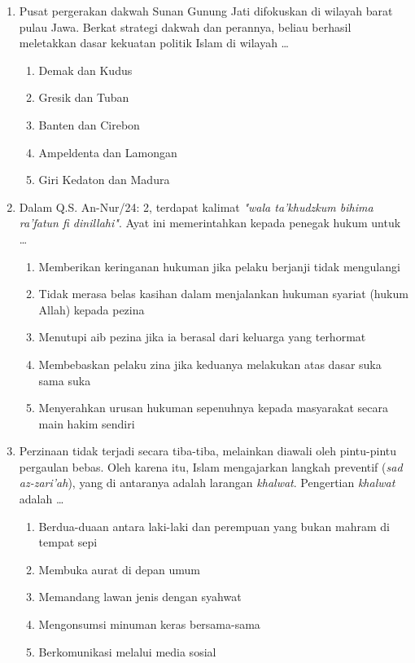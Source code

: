 \documentclass[12pt,a4paper]{article}
\begin{document}
\begin{enumerate}[leftmargin=*]
\item Pusat pergerakan dakwah Sunan Gunung Jati difokuskan di wilayah barat pulau Jawa. Berkat strategi dakwah dan perannya, beliau berhasil meletakkan dasar kekuatan politik Islam di wilayah \dots
    \begin{enumerate}[label=\alph*.]
        \item Demak dan Kudus
        \item Gresik dan Tuban
        \item Banten dan Cirebon
        \item Ampeldenta dan Lamongan
        \item Giri Kedaton dan Madura
    \end{enumerate}

\item Dalam Q.S. An-Nur/24: 2, terdapat kalimat \textit{"wala ta'khudzkum bihima ra'fatun fi dinillahi"}. Ayat ini memerintahkan kepada penegak hukum untuk \dots
    \begin{enumerate}[label=\alph*.]
        \item Memberikan keringanan hukuman jika pelaku berjanji tidak mengulangi
        \item Tidak merasa belas kasihan dalam menjalankan hukuman syariat (hukum Allah) kepada pezina
        \item Menutupi aib pezina jika ia berasal dari keluarga yang terhormat
        \item Membebaskan pelaku zina jika keduanya melakukan atas dasar suka sama suka
        \item Menyerahkan urusan hukuman sepenuhnya kepada masyarakat secara main hakim sendiri
    \end{enumerate}

\item Perzinaan tidak terjadi secara tiba-tiba, melainkan diawali oleh pintu-pintu pergaulan bebas. Oleh karena itu, Islam mengajarkan langkah preventif (\textit{sad az-zari'ah}), yang di antaranya adalah larangan \textit{khalwat}. Pengertian \textit{khalwat} adalah \dots
    \begin{enumerate}[label=\alph*.]
        \item Berdua-duaan antara laki-laki dan perempuan yang bukan mahram di tempat sepi
        \item Membuka aurat di depan umum
        \item Memandang lawan jenis dengan syahwat
        \item Mengonsumsi minuman keras bersama-sama
        \item Berkomunikasi melalui media sosial
    \end{enumerate}


\end{enumerate}
\end{document}
